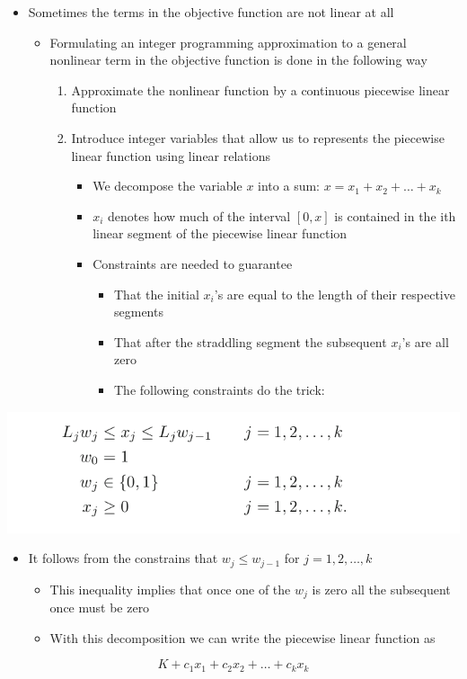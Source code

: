 \documentclass[11pt]{article}
\begin{document}
\begin{itemize}
\item Sometimes the terms in the objective function are not linear at all
\begin{itemize}
\item Formulating an integer programming approximation to a general nonlinear term in the objective function is done in the following way
\begin{enumerate}
\item Approximate the nonlinear function by a continuous piecewise linear function
\item Introduce integer variables that allow us to represents the piecewise linear function using linear relations
\begin{itemize}
\item We decompose the variable \(x\) into a sum: \(x=x_1+x_2+ \dots + x_k\)
\item \(x_i\) denotes how much of the interval \([0,x]\) is contained in the ith linear segment of the piecewise linear function
\item Constraints are needed to guarantee
\begin{itemize}
\item That the initial \(x_i\)'s are equal to the length of their respective segments
\item That after the straddling segment the subsequent \(x_i\)'s are all zero
\item The following constraints do the trick:
\end{itemize}
\end{itemize}
\end{enumerate}
\end{itemize}
\end{itemize}
\begin{center}
\includegraphics[width=.9\linewidth]{Integer Programming/screenshot_2019-02-17_10-26-18.png}
\end{center}

\begin{itemize}
\item It follows from the constrains that \(w_j \leq w_{j-1}\) for \(j=1,2,\dots,k\)
\begin{itemize}
\item This inequality implies that once one of the \(w_j\) is zero all the subsequent once must be zero
\item With this decomposition we can write the piecewise linear function as
\end{itemize}
\end{itemize}
\begin{equation}
  K + c_1x_1 + c_2x_2 + \dots + c_k x_k
\end{equation} 
\end{document}
